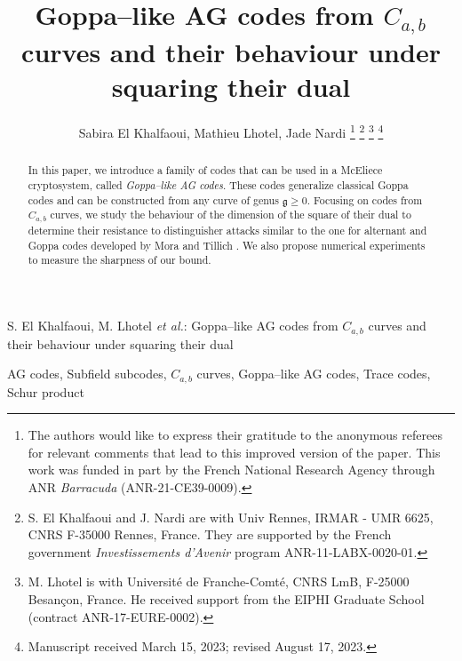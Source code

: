 \documentclass[peerreview]{IEEEtran}
\theoremstyle{plain}
\theoremstyle{definition}
\theoremstyle{remark}
\begin{document}
	
	\title{Goppa--like AG codes from $C_{a,b}$ curves and their behaviour under squaring their dual}
	

	\author{Sabira El Khalfaoui, Mathieu Lhotel, Jade Nardi
		\thanks{The authors would like to express their gratitude to the anonymous referees for relevant comments that lead to this improved version of the paper. This work was funded in part by the French National Research Agency through ANR \textit{Barracuda} (ANR-21-CE39-0009).}
		\thanks{ S. El Khalfaoui and J. Nardi are with Univ Rennes, IRMAR - UMR 6625, CNRS F-35000 Rennes, France. They are supported by the French government \textit{Investissements d’Avenir} program ANR-11-LABX-0020-01.} 
		\thanks{M. Lhotel is with Université de Franche-Comté, CNRS LmB, F-25000 Besançon, France. He received support from the  EIPHI Graduate School (contract ANR-17-EURE-0002).}%
		\thanks{Manuscript received March 15, 2023; revised August 17, 2023.}}
	
	{S. El Khalfaoui, M. Lhotel \MakeLowercase{\textit{et al.}}: Goppa--like AG codes from $C_{a,b}$ curves and their behaviour under squaring their dual}
	
	
	
	
	\maketitle
	
	\begin{abstract}
		In this paper, we introduce a family of codes that can be used in a McEliece cryptosystem, called \emph{Goppa--like AG codes}. These codes generalize classical Goppa codes and can be constructed from any curve of genus $\mathfrak{g} \geq 0$. Focusing on codes from $C_{a,b}$ curves, we study the behaviour of the dimension of the square of their dual to determine their resistance to distinguisher attacks similar to the one for alternant and Goppa codes developed by Mora and Tillich \cite{MT21}. We also propose numerical experiments to measure the sharpness of our bound.
	\end{abstract}
	
	\begin{IEEEkeywords}
		AG codes, Subfield subcodes, $C_{a,b}$ curves, Goppa--like AG codes, Trace codes, Schur product
	\end{IEEEkeywords}
	
\end{document}
